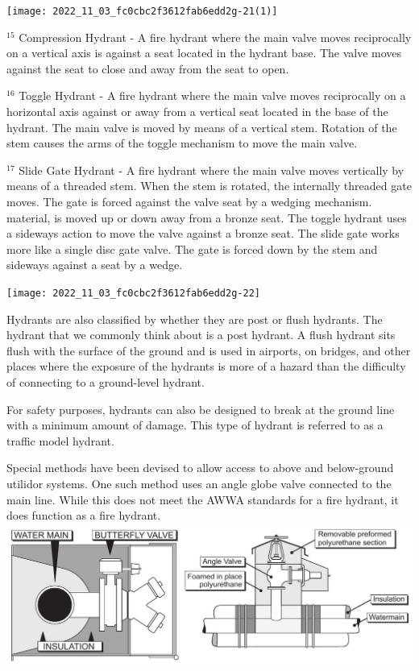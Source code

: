 \documentclass[10pt]{article}
\begin{document}
\texttt{[image: 2022\_11\_03\_fc0cbc2f3612fab6edd2g-21(1)]}

${ }^{15}$ Compression Hydrant - A fire hydrant where the main valve moves reciprocally on a vertical axis is against a seat located in the hydrant base. The valve moves against the seat to close and away from the seat to open.

${ }^{16}$ Toggle Hydrant - A fire hydrant where the main valve moves reciprocally on a horizontal axis against or away from a vertical seat located in the base of the hydrant. The main valve is moved by means of a vertical stem. Rotation of the stem causes the arms of the toggle mechanism to move the main valve.

${ }^{17}$ Slide Gate Hydrant - A fire hydrant where the main valve moves vertically by means of a threaded stem. When the stem is rotated, the internally threaded gate moves. The gate is forced against the valve seat by a wedging mechanism. material, is moved up or down away from a bronze seat. The toggle hydrant uses a sideways action to move the valve against a bronze seat. The slide gate works more like a single disc gate valve. The gate is forced down by the stem and sideways against a seat by a wedge.

\texttt{[image: 2022\_11\_03\_fc0cbc2f3612fab6edd2g-22]}

Hydrants are also classified by whether they are post or flush hydrants. The hydrant that we commonly think about is a post hydrant. A flush hydrant sits flush with the surface of the ground and is used in airports, on bridges, and other places where the exposure of the hydrants is more of a hazard than the difficulty of connecting to a ground-level hydrant.

For safety purposes, hydrants can also be designed to break at the ground line with a minimum amount of damage. This type of hydrant is referred to as a traffic model hydrant.

Special methods have been devised to allow access to above and below-ground utilidor systems. One such method uses an angle globe valve connected to the main line. While this does not meet the AWWA standards for a fire hydrant, it does function as a fire hydrant.\\

\includegraphics[max width=\textwidth]{2022_11_03_fc0cbc2f3612fab6edd2g-22(1)}
\end{document}
